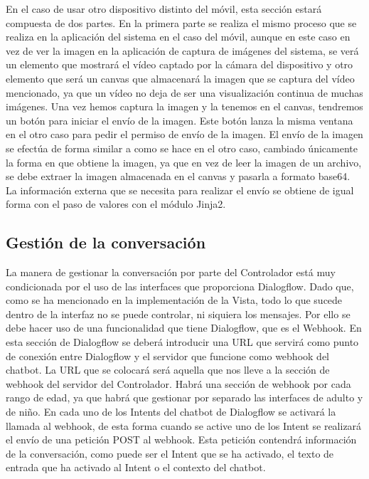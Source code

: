 En el caso de usar otro dispositivo distinto del móvil, esta sección estará compuesta de dos partes. En la primera parte se realiza el mismo proceso que se realiza en la aplicación del sistema en el caso del móvil, aunque en este caso en vez de ver la imagen en la aplicación de captura de imágenes del sistema, se verá un elemento que mostrará el vídeo captado por la cámara del dispositivo y otro elemento que será un canvas que almacenará la imagen que se captura del vídeo mencionado, ya que un vídeo no deja de ser una visualización continua de muchas imágenes. Una vez hemos captura la imagen y la tenemos en el canvas, tendremos un botón para iniciar el envío de la imagen. Este botón lanza la misma ventana en el otro caso para pedir el permiso de envío de la imagen. El envío de la imagen se efectúa de forma similar a como se hace en el otro caso, cambiado únicamente la forma en que obtiene la imagen, ya que en vez de leer la imagen de un archivo, se debe extraer la imagen almacenada en el canvas y pasarla a formato base64. La información externa que se necesita para realizar el envío se obtiene de igual forma con el paso de valores con el módulo Jinja2.

\subsection{Gestión de la conversación}

La manera de gestionar la conversación por parte del Controlador está muy condicionada por el uso de las interfaces que proporciona Dialogflow. Dado que, como se ha mencionado en la implementación de la Vista, todo lo que sucede dentro de la interfaz no se puede controlar, ni siquiera los mensajes. Por ello se debe hacer uso de una funcionalidad que tiene Dialogflow, que es el Webhook. En esta sección de Dialogflow se deberá introducir una URL que servirá como punto de conexión entre Dialogflow y el servidor que funcione como webhook del chatbot. La URL que se colocará será aquella que nos lleve a la sección de webhook del servidor del Controlador. Habrá una sección de webhook por cada rango de edad, ya que habrá que gestionar por separado las interfaces de adulto y de niño. En cada uno de los Intents del chatbot de Dialogflow se activará la llamada al webhook, de esta forma cuando se active uno de los Intent se realizará el envío de una petición POST al webhook. Esta petición contendrá información de la conversación, como puede ser el Intent que se ha activado, el texto de entrada que ha activado al Intent o el contexto del chatbot.

